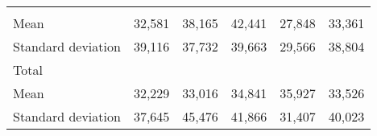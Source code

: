 \begin{tabular}{llllll}
  \multicolumn{1}{|r}{} &
  \multicolumn{1}{r}{} &
  \multicolumn{1}{r}{} &
  \multicolumn{1}{r}{} &
  \multicolumn{1}{r}{} \\
\multicolumn{1}{l}{\hspace{4em}Mean} &
  \multicolumn{1}{|r}{32,581} &
  \multicolumn{1}{r}{38,165} &
  \multicolumn{1}{r}{42,441} &
  \multicolumn{1}{r}{27,848} &
  \multicolumn{1}{r}{33,361} \\
\multicolumn{1}{l}{\hspace{4em}Standard deviation} &
  \multicolumn{1}{|r}{39,116} &
  \multicolumn{1}{r}{37,732} &
  \multicolumn{1}{r}{39,663} &
  \multicolumn{1}{r}{29,566} &
  \multicolumn{1}{r}{38,804} \\
\multicolumn{1}{l}{\hspace{3em}Total} &
  \multicolumn{1}{|r}{} &
  \multicolumn{1}{r}{} &
  \multicolumn{1}{r}{} &
  \multicolumn{1}{r}{} &
  \multicolumn{1}{r}{} \\
\multicolumn{1}{l}{\hspace{4em}Mean} &
  \multicolumn{1}{|r}{32,229} &
  \multicolumn{1}{r}{33,016} &
  \multicolumn{1}{r}{34,841} &
  \multicolumn{1}{r}{35,927} &
  \multicolumn{1}{r}{33,526} \\
\multicolumn{1}{l}{\hspace{4em}Standard deviation} &
  \multicolumn{1}{|r}{37,645} &
  \multicolumn{1}{r}{45,476} &
  \multicolumn{1}{r}{41,866} &
  \multicolumn{1}{r}{31,407} &
  \multicolumn{1}{r}{40,023} \\
\cline{1-6}
\end{tabular}


